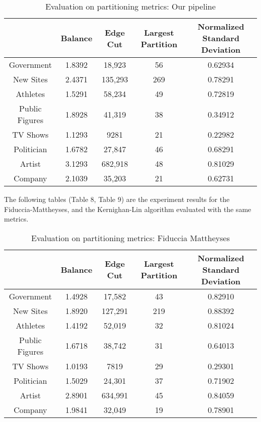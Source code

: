 \begin{table}[H]
\centering
\caption{Evaluation on partitioning metrics: Our pipeline}
\label{t1}
\begin{tabular}{|c|c|c|c|c|}
\noalign{\smallskip}\noalign{\smallskip}\hline
& Balance & Edge Cut & Largest Partition & Normalized Standard Deviation\\
\hline
Government & 1.8392 & 18,923 & 56 & 0.62934 \\
\hline
New Sites & 2.4371 & 135,293 & 269 & 0.78291 \\
\hline
Athletes & 1.5291 & 58,234 & 49 & 0.72819 \\
\hline
Public Figures & 1.8928 & 41,319 & 38 & 0.34912\\
\hline
TV Shows & 1.1293 & 9281 & 21 & 0.22982\\
\hline
Politician & 1.6782 & 27,847 & 46 & 0.68291\\
\hline
Artist & 3.1293 & 682,918 & 48 & 0.81029\\
\hline
Company & 2.1039 & 35,203 & 21 & 0.62731\\
\hline
\end{tabular}
\end{table}
The following tables (Table 8, Table 9) are the experiment results for the Fiduccia-Mattheyses, and the Kernighan-Lin algorithm evaluated with the same metrics. 

\begin{table}[H]
\label{t1}
\centering
\caption{Evaluation on partitioning metrics: Fiduccia Mattheyses}
\label{t1}
\begin{tabular}{|c|c|c|c|c|}
\noalign{\smallskip}\noalign{\smallskip}\hline
& Balance & Edge Cut & Largest Partition & Normalized Standard Deviation\\
\hline
Government & 1.4928 & 17,582 & 43 & 0.82910 \\
\hline
New Sites & 1.8920 & 127,291 & 219 & 0.88392 \\
\hline
Athletes & 1.4192 & 52,019 & 32 & 0.81024 \\
\hline
Public Figures & 1.6718 & 38,742 & 31 & 0.64013\\
\hline
TV Shows & 1.0193 & 7819 & 29 & 0.29301\\
\hline
Politician & 1.5029 & 24,301 & 37 & 0.71902\\
\hline
Artist & 2.8901 & 634,991 & 45 & 0.84059\\
\hline
Company & 1.9841 & 32,049 & 19 & 0.78901\\
\hline
\end{tabular}
\end{table}

